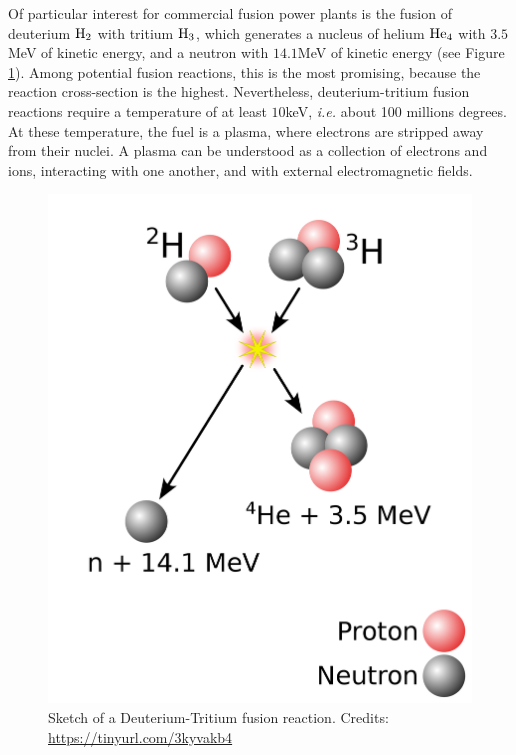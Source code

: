 \documentclass[my_thesis.tex]{subfiles}
\begin{document}
Of particular interest for commercial fusion power plants is the fusion of deuterium $\ce{H2}$ with tritium $\ce{H3}$, which generates a nucleus of helium $\ce{He4}$ with $3.5$MeV of kinetic energy, and a neutron with $14.1$MeV of kinetic energy (see Figure \ref{fig. dt fusion}). Among potential fusion reactions, this is the most promising, because the reaction cross-section is the highest. Nevertheless, deuterium-tritium fusion reactions require a temperature of at least $10$keV, \textit{i.e.} about 100 millions degrees. At these temperature, the fuel is a plasma, where electrons are stripped away from their nuclei. A plasma can be understood as a collection of electrons and ions, interacting with one another, and with external electromagnetic fields.
\begin{figure}
    \centering
    \includegraphics[width=.5\linewidth]{images/Introduction/DTFusion.png}
    \caption{Sketch of a Deuterium-Tritium fusion reaction. Credits: \url{https://tinyurl.com/3kyvakb4}}
    \label{fig. dt fusion}
\end{figure}
\end{document}
